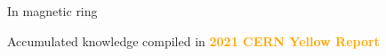 \begin{frame}
\begin{block}{In magnetic ring}
\begin{itemize}
\begin{itemize}
		\end{itemize}
	\end{itemize} 
\end{block}

\vspace{-0.3cm}
\begin{exampleblock}{Accumulated knowledge compiled in}
	\hspace{1cm}	\textcolor{orange}{\textbf{2021 CERN Yellow Report}}\,\textcolor{PineGreen}{\small \cite{CPEDM:2019nwp}}
\end{exampleblock}

\end{frame}